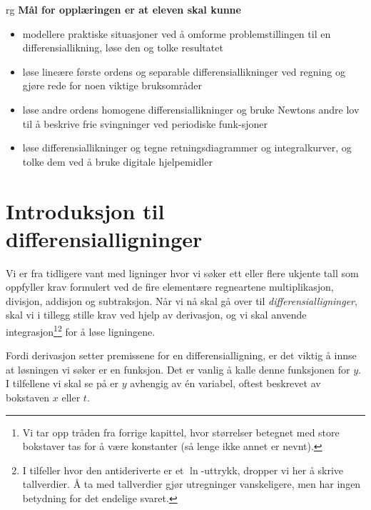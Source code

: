 



{rg}
\eqlen
\vspace{\parskip}
\textbf{Mål for opplæringen er at eleven skal kunne}
\begin{itemize}
	\item modellere praktiske situasjoner ved å omforme problemstillingen til en differensiallikning, løse den og tolke resultatet
	\item løse lineære første ordens og separable differensiallikninger ved regning og gjøre rede for noen viktige bruksområder
	\item løse andre ordens homogene differensiallikninger og bruke Newtons andre lov til å beskrive frie svingninger ved periodiske funk-sjoner
	\item løse differensiallikninger og tegne retningsdiagrammer og integralkurver, og tolke dem ved å bruke digitale hjelpemidler
\end{itemize}

\newpage
\section{Introduksjon til differensialligninger\label{difgen}}
Vi er fra tidligere vant med ligninger hvor vi søker ett eller flere ukjente tall som oppfyller krav formulert ved de fire elementære regneartene multiplikasjon, divisjon, addisjon og subtraksjon. Når vi nå skal gå over til \textit{differensialligninger}, skal vi i tillegg stille krav ved hjelp av derivasjon, og vi skal anvende integrasjon\footnote{Vi tar opp tråden fra forrige kapittel, hvor størrelser betegnet med store bokstaver tas for å være konstanter (så lenge ikke annet er nevnt).}\footnote{I tilfeller hvor den antideriverte er et $\ln $-uttrykk, dropper vi her å skrive tallverdier. Å ta med tallverdier gjør utregninger vanskeligere, men har ingen betydning for det endelige svaret.} for å løse ligningene. \vsk

Fordi derivasjon setter premissene for en differensialligning, er det viktig å innse at løsningen vi søker er en funksjon. Det er vanlig å kalle denne funksjonen for $ y$. I tilfellene vi skal se på er $ y $ avhengig av én variabel, oftest beskrevet av bokstaven $ x $ eller $ t $.

